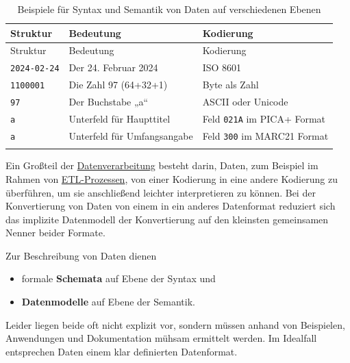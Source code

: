 \documentclass[
  11pt,
  letterpaper,
  DIV=11,
  twoside]{scrreprt}
\begin{document}
\begin{longtable}[]{@{}lll@{}}
\toprule\noalign{}
Struktur & Bedeutung & Kodierung \\
\midrule\noalign{}
\endfirsthead
\toprule\noalign{}
Struktur & Bedeutung & Kodierung \\
\midrule\noalign{}
\endhead
\bottomrule\noalign{}
\endlastfoot
\texttt{2024-02-24} & Der 24. Februar 2024 & ISO 8601 \\
\texttt{1100001} & Die Zahl 97 (64+32+1) & Byte als Zahl \\
\texttt{97} & Der Buchstabe „a`` & ASCII oder Unicode \\
\texttt{a} & Unterfeld für Haupttitel & Feld \texttt{021A} im PICA+
Format \\
\texttt{a} & Unterfeld für Umfangsangabe & Feld \texttt{300} im MARC21
Format \\
\caption{Beispiele für Syntax und Semantik von Daten auf verschiedenen
Ebenen}\label{tbl-daten-ebenen}\tabularnewline
\end{longtable}

Ein Großteil der
\hyperref[datenverarbeitungsprozess-in-bibliotheken]{Datenverarbeitung}
besteht darin, Daten, zum Beispiel im Rahmen von
\hyperref[etl-prozess]{ETL-Prozessen}, von einer Kodierung in eine
andere Kodierung zu überführen, um sie anschließend leichter
interpretieren zu können. Bei der Konvertierung von Daten von einem in
ein anderes Datenformat reduziert sich das implizite Datenmodell der
Konvertierung auf den kleinsten gemeinsamen Nenner beider Formate.

Zur Beschreibung von Daten dienen

\begin{itemize}
\item
  formale \textbf{Schemata} auf Ebene der Syntax und
\item
  \textbf{Datenmodelle} auf Ebene der Semantik.
\end{itemize}

Leider liegen beide oft nicht explizit vor, sondern müssen anhand von
Beispielen, Anwendungen und Dokumentation mühsam ermittelt werden. Im
Idealfall entsprechen Daten einem klar definierten Datenformat.
\end{document}
